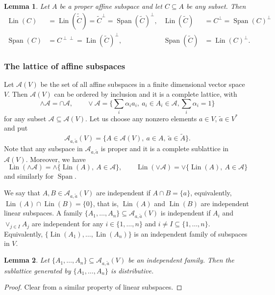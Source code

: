 \documentclass[12pt]{article}
\newtheorem{lemma}{Lemma}
\theoremstyle{definition}
\theoremstyle{remark}
\def\lin{\operatorname{Lin}}
\def\Span{\operatorname{Span}}
\def\Ae{\mathcal A}
\begin{document}
\begin{lemma}\label{lemma:duality}
Let $A$ be a proper affine subspace and let $C\subseteq A$ be any subset. Then
\begin{align*}
\lin(C)&=\lin(\tilde{\tilde C})=\tilde
C^\perp=\Span(\tilde C)^\perp,&  \lin(\tilde C)&=C^\perp=\Span(C)^\perp \\
\Span(C)&=C^{\perp\perp} =\lin(\tilde C)^\perp,&  \Span(\tilde C)&=\lin(C)^\perp.
\end{align*}


\end{lemma}


\subsubsection{The lattice of affine subspaces}

Let $\Ae(V)$ be the set of all affine subspaces in a finite dimensional vector space $V$.
Then $\Ae(V)$ can be ordered by inclusion and it is a complete lattice, with
\[
\wedge \Ae=\cap \Ae,\qquad \vee \Ae = \{\sum_i\alpha_i a_i,\ a_i\in A_i\in \Ae,
\sum_i\alpha_i=1\}
\]
for any subset $\Ae\subseteq \Ae(V)$. Let us choose any nonzero elements $a\in V$,
$\tilde a\in V^*$ and put
\[
\Ae_{a,\tilde a}(V)=\{A\in \Ae(V),\ a\in A,\ \tilde a\in \tilde A\}.
\]
Note that any subspace in $\Ae_{a,\tilde a}$ is proper and it is a complete sublattice in
$\Ae(V)$. Moreover, we have
\[
\lin(\wedge\Ae)=\wedge\{\lin(A),\ A\in \Ae\},\qquad \lin(\vee\Ae)=\vee\{\lin(A),\ A\in \Ae\}
\]
and similarly for $\Span$. 

We say that $A,B\in \Ae_{a,\tilde a}(V)$ are independent if $A\cap B=\{a\}$, equivalently,
$\lin(A)\cap\lin(B)=\{0\}$, that is, $\lin(A)$ and $\lin(B)$ are independent linear
subspaces. A family $\{A_1,\dots,A_n\}\subseteq \Ae_{a,\tilde a}(V)$ is independent if
$A_i$ and $\vee_{j\in I}A_j$ are independent for any $i\in \{1,\dots,n\}$ and $i\ne
I\subseteq\{1,\dots,n\}$. Equivalently, $\{\lin(A_1),\dots,\lin(A_n)\}$ is an independent
family of subspaces in $V$. 

\begin{lemma}\label{lemma:affine_distributive} Let $\{A_1,\dots,A_n\}\subseteq
\Ae_{a,\tilde a}(V)$ be an independent family. Then the sublattice generated by
$\{A_1,\dots,A_n\}$ is distributive.



\end{lemma}

\begin{proof} Clear from a similar property of linear subspaces.   

\end{proof}
\end{document}
